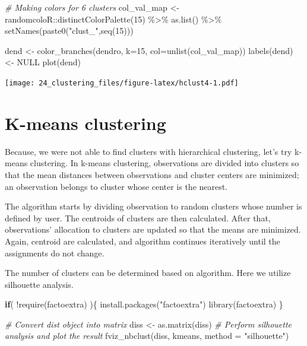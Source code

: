 \documentclass[
]{book}
\newenvironment{Shaded}{\begin{snugshade}}{\end{snugshade}}
\newcommand{\AttributeTok}[1]{\textcolor[rgb]{0.77,0.63,0.00}{#1}}
\newcommand{\CommentTok}[1]{\textcolor[rgb]{0.56,0.35,0.01}{\textit{#1}}}
\newcommand{\ConstantTok}[1]{\textcolor[rgb]{0.00,0.00,0.00}{#1}}
\newcommand{\ControlFlowTok}[1]{\textcolor[rgb]{0.13,0.29,0.53}{\textbf{#1}}}
\newcommand{\DecValTok}[1]{\textcolor[rgb]{0.00,0.00,0.81}{#1}}
\newcommand{\FunctionTok}[1]{\textcolor[rgb]{0.00,0.00,0.00}{#1}}
\newcommand{\NormalTok}[1]{#1}
\newcommand{\OtherTok}[1]{\textcolor[rgb]{0.56,0.35,0.01}{#1}}
\newcommand{\SpecialCharTok}[1]{\textcolor[rgb]{0.00,0.00,0.00}{#1}}
\newcommand{\StringTok}[1]{\textcolor[rgb]{0.31,0.60,0.02}{#1}}
\begin{document}
\begin{Shaded}
\begin{Highlighting}[]
\CommentTok{\# Making colors for 6 clusters}
\NormalTok{col\_val\_map }\OtherTok{\textless{}{-}}\NormalTok{ randomcoloR}\SpecialCharTok{::}\FunctionTok{distinctColorPalette}\NormalTok{(}\DecValTok{15}\NormalTok{) }\SpecialCharTok{\%\textgreater{}\%}
     \FunctionTok{as.list}\NormalTok{() }\SpecialCharTok{\%\textgreater{}\%} \FunctionTok{setNames}\NormalTok{(}\FunctionTok{paste0}\NormalTok{(}\StringTok{"clust\_"}\NormalTok{,}\FunctionTok{seq}\NormalTok{(}\DecValTok{15}\NormalTok{)))}

\NormalTok{dend }\OtherTok{\textless{}{-}} \FunctionTok{color\_branches}\NormalTok{(dendro, }\AttributeTok{k=}\DecValTok{15}\NormalTok{, }\AttributeTok{col=}\FunctionTok{unlist}\NormalTok{(col\_val\_map))}
\FunctionTok{labels}\NormalTok{(dend) }\OtherTok{\textless{}{-}} \ConstantTok{NULL}
\FunctionTok{plot}\NormalTok{(dend)}
\end{Highlighting}
\end{Shaded}

\texttt{[image: 24\_clustering\_files/figure-latex/hclust4-1.pdf]}

\hypertarget{k-means-clustering}{%
\section{K-means clustering}\label{k-means-clustering}}

Because, we were not able to find clusters with hierarchical clustering, let's try
k-means clustering. In k-means clustering, observations are divided into clusters
so that the mean distances between observations and cluster centers are minimized;
an observation belongs to cluster whose center is the nearest.

The algorithm starts by dividing observation to random clusters whose number is
defined by user. The centroids of clusters are then calculated. After that, observations'
allocation to clusters are updated so that the means are minimized. Again, centroid
are calculated, and algorithm continues iteratively until the assignments do not change.

The number of clusters can be determined based on algorithm. Here we utilize silhouette
analysis.

\begin{Shaded}
\begin{Highlighting}[]
\ControlFlowTok{if}\NormalTok{( }\SpecialCharTok{!}\FunctionTok{require}\NormalTok{(factoextra) )\{}
    \FunctionTok{install.packages}\NormalTok{(}\StringTok{"factoextra"}\NormalTok{)}
    \FunctionTok{library}\NormalTok{(factoextra)}
\NormalTok{\}}

\CommentTok{\# Convert dist object into matrix}
\NormalTok{diss }\OtherTok{\textless{}{-}} \FunctionTok{as.matrix}\NormalTok{(diss)}
\CommentTok{\# Perform silhouette analysis and plot the result}
\FunctionTok{fviz\_nbclust}\NormalTok{(diss, kmeans, }\AttributeTok{method =} \StringTok{"silhouette"}\NormalTok{)}
\end{Highlighting}
\end{Shaded}
\end{document}
